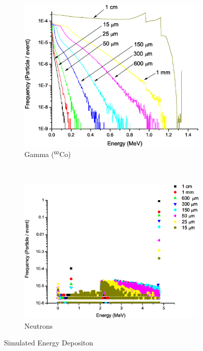 \documentclass{anstrans}
\newcommand{\iso}[2]{${}^{#2}${#1}}
\newcommand{\figurewidth}{0.45\textwidth}
\begin{document}
\begin{figure}[!ht]
	\centering
	\begin{subfigure}[b]{\figurewidth}
    		\includegraphics[width=\textwidth]{PS_EDepSim_Co60}
		\caption{Gamma (\iso{Co}{60})}
	\end{subfigure}%
	~
	\begin{subfigure}[b]{\figurewidth}
    		\includegraphics[width=\textwidth]{PS_EDepSim_Neutron}
		\caption{Neutrons}
	\end{subfigure}%
	\caption{Simulated Energy Depositon}
	\label{fig:SimEDepGamma}
\end{figure}
\end{document}
